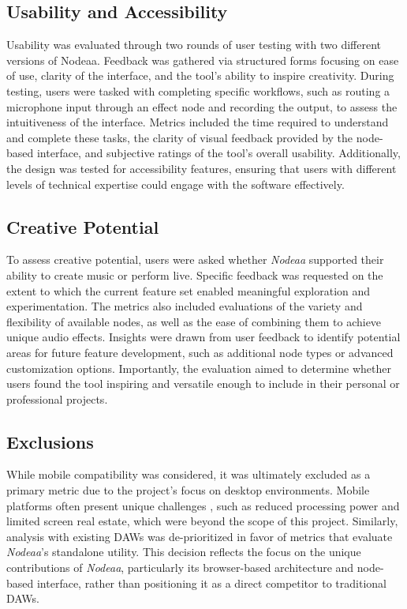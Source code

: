 \documentclass[10pt,twocolumn]{article}
\begin{document}
\subsection{Usability and Accessibility}
Usability was evaluated through two rounds of user testing with two different versions of Nodeaa. Feedback was gathered via structured forms focusing on ease of use, clarity of the interface, and the tool’s ability to inspire creativity. During testing, users were tasked with completing specific workflows, such as routing a microphone input through an effect node and recording the output, to assess the intuitiveness of the interface. Metrics included the time required to understand and complete these tasks, the clarity of visual feedback provided by the node-based interface, and subjective ratings of the tool’s overall usability. Additionally, the design was tested for accessibility features, ensuring that users with different levels of technical expertise could engage with the software effectively.

\subsection{Creative Potential}
To assess creative potential, users were asked whether \textit{Nodeaa} supported their ability to create music or perform live. Specific feedback was requested on the extent to which the current feature set enabled meaningful exploration and experimentation. The metrics also included evaluations of the variety and flexibility of available nodes, as well as the ease of combining them to achieve unique audio effects. Insights were drawn from user feedback to identify potential areas for future feature development, such as additional node types or advanced customization options. Importantly, the evaluation aimed to determine whether users found the tool inspiring and versatile enough to include in their personal or professional projects.

\subsection{Exclusions}
While mobile compatibility was considered, it was ultimately excluded as a primary metric due to the project’s focus on desktop environments. Mobile platforms often present unique challenges \cite{clauhs2022daw}, such as reduced processing power and limited screen real estate, which were beyond the scope of this project. Similarly, analysis with existing DAWs was de-prioritized in favor of metrics that evaluate \textit{Nodeaa}'s standalone utility. This decision reflects the focus on the unique contributions of \textit{Nodeaa}, particularly its browser-based architecture and node-based interface, rather than positioning it as a direct competitor to traditional DAWs.
\end{document}
